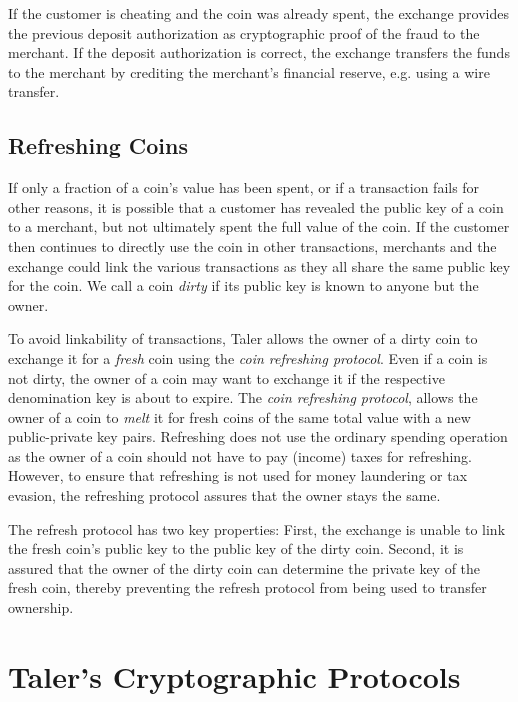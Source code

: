 \documentclass[sigconf, authordraft]{acmart}
\begin{document}
If the customer is cheating and the coin was already spent, the
exchange provides the previous deposit authorization as cryptographic
proof of the fraud to the merchant.  If the deposit authorization is
correct, the exchange transfers the funds to the merchant by crediting
the merchant's financial reserve, e.g. using a wire transfer.


\subsection{Refreshing Coins}

If only a fraction of a coin's value has been spent, or if a
transaction fails for other reasons, it is possible that a customer
has revealed the public key of a coin to a merchant, but not
ultimately spent the full value of the coin.  If the customer then
continues to directly use the coin in other transactions, merchants
and the exchange could link the various transactions as they all share
the same public key for the coin.  We call a coin {\em dirty} if its
public key is known to anyone but the owner.

To avoid linkability of transactions, Taler allows the owner of a
dirty coin to exchange it for a {\em fresh} coin using the {\em coin
  refreshing protocol}.  Even if a coin is not dirty, the owner of a
coin may want to exchange it if the respective denomination key is
about to expire.  The {\em coin refreshing protocol}, allows the owner
of a coin to {\em melt} it for fresh coins of the same total value with a
new public-private key pairs.  Refreshing does not use the ordinary
spending operation as the owner of a coin should not have to pay
(income) taxes for refreshing.  However, to ensure that refreshing is
not used for money laundering or tax evasion, the refreshing protocol
assures that the owner stays the same.

The refresh protocol has two key properties: First, the exchange is
unable to link the fresh coin's public key to the public key of the
dirty coin.  Second, it is assured that the owner of the dirty coin
can determine the private key of the fresh coin, thereby preventing
the refresh protocol from being used to transfer ownership.


\section{Taler's Cryptographic Protocols}
\end{document}
